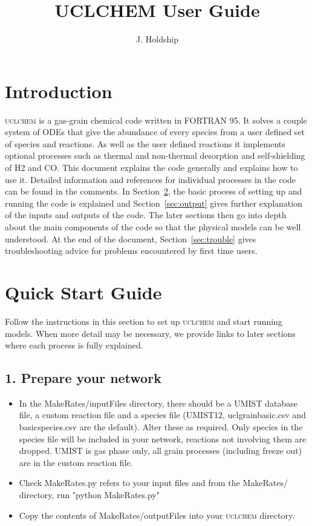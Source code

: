 \documentclass{llncs}
\begin{document}
\title{UCLCHEM User Guide}
\author{J. Holdship}

\maketitle

\section{Introduction}
\textsc{uclchem} is a gas-grain chemical code written in FORTRAN 95. It solves a couple system of ODEs that give the abundance of every species from a user defined set of species and reactions. As well as the user defined reactions it implements optional processes such as thermal and non-thermal desorption and self-shielding of H2 and CO. This document explains the code generally and explains how to use it. Detailed information and references for individual processes in the code can be found in the comments. In Section~\ref{sec:quick}, the basic process of setting up and running the code is explained and Section~\ref{sec:output} gives further explanation of the inputs and outputs of the code. The later sections then go into depth about the main components of the code so that the physical models can be well understood. At the end of the document, Section~\ref{sec:trouble} gives troubleshooting advice for problems encountered by first time users.

\section{Quick Start Guide}
\label{sec:quick}
Follow the instructions in this section to set up \textsc{uclchem} and start running models. When more detail may be necessary, we provide links to later sections where each process is fully explained.
%
\subsection{1. Prepare your network}
\begin{itemize}
\item In the MakeRates/inputFiles directory, there should be a UMIST database file, a custom reaction file and a species file (UMIST12, uclgrainbasic.csv and basicspecies.csv are the default). Alter these as required. Only species in the species file will be included in your network, reactions not involving them are dropped. UMIST is gas phase only, all grain processes (including freeze out) are in the custom reaction file.
\item Check MakeRates.py refers to your input files and from the MakeRates/ directory, run "python MakeRates.py"
\item Copy the contents of MakeRates/outputFiles into your \textsc{uclchem} directory.
\end{itemize}
%
\end{document}
